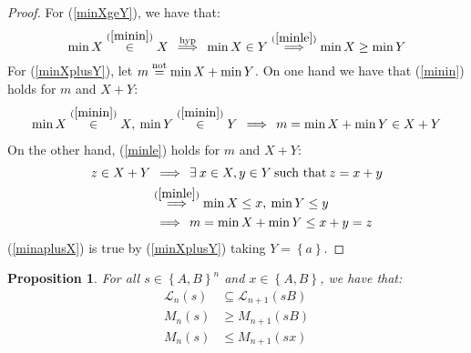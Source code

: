 \documentclass[a4paper,9pt,leqno]{article}
\renewcommand{\=}{\protect\nobreakdash-\hspace{0pt}}
\renewcommand{\~}{\protect\nobreakdash--\hspace{0pt}}
\theoremstyle{plain}
\newtheorem{proposition}[fact]{Proposition}
\theoremstyle{definition}
\theoremstyle{remark}
\newcommand{\impll}{\:\:\Longrightarrow\:\:}
\newcommand{\impl}{\impll}%
\newcommand{\parref}[1]{(\ref{#1})}
\newcommand{\by}[1]{{#1}}
\newcommand{\bynot}{\by{not}}
\newcommand{\byhyp}{\by{hyp}}
\newcommand{\symby}[2]{\stackrel{#1}{{#2}}}
\newcommand{\symbyrm}[2]{\symby{{\rm\scriptstyle{#1}}}{#2}}
\newcommand{\implby}[1]{\symbyrm{#1}{\impll}}
\newcommand{\implbyref}[1]{\implby{\parref{#1}}}
\newcommand{\implbyhyp}{\implby{\byhyp}}
\newcommand{\eqby}[1]{\symbyrm{#1}{=}}
\newcommand{\eqbynot}{\eqby{\bynot}}
\newcommand{\inby}[1]{\symbyrm{#1}{\in}}
\newcommand{\inbyref}[1]{\inby{\parref{#1}}}
\newcommand{\txt}[1]{\:\text{#1}\:}
\newcommand{\mc}{,\:}
\newcommand{\ms}{\:}
\newcommand{\lp}{\left(}
\newcommand{\lc}{\left\{}
\newcommand{\rp}{\right)}
\newcommand{\rc}{\right\}}
\begin{document}
\begin{proof}
For \parref{minXgeY}, we have that:
%
\begin{equation*}
\min X \inbyref{minin} X
    \implbyhyp \min X \in Y
    \implbyref{minle} \min X \ge \min Y
\end{equation*}
%
For \parref{minXplusY}, let $m \eqbynot \min X + \min Y$. On one hand
we have that \parref{minin} holds for $m$ and $X + Y$:
%
\begin{align*}
\min X \inbyref{minin} X \mc
\min Y \inbyref{minin} Y \impl
m = \min X + \min Y \in X + Y
\end{align*}
%
On the other hand, \parref{minle} holds for $m$ and $X + Y$:
\begin{align*}
z \in X + Y & \impl \exists\ms x \in X, y \in Y \txt{such that} z = x + y \\
            & \implbyref{minle} \min X \le x \mc \min Y \le y \\
            & \impl m = \min X + \min Y \le x + y = z
\end{align*}
\parref{minaplusX} is true by \parref{minXplusY} taking $Y = \lc a\rc$.
\end{proof}

\begin{proposition}
For all $s \in \lc A, B\rc^n$ and $x \in\lc A, B\rc$,
we have that:
%
\begin{align}
\mathcal{L}_n \lp s \rp & \subseteq \mathcal{L}_{n+1} \lp s B\rp
    \label{LLnsubseteqLLnplus1} \\
M_n \lp s \rp & \ge M_{n+1} \lp s B\rp
    \label{MngeMnplus1} \\
M_n \lp s \rp & \le M_{n+1} \lp s x\rp
    \label{MnleMnplus1}
\end{align}
\end{proposition}
\end{document}

